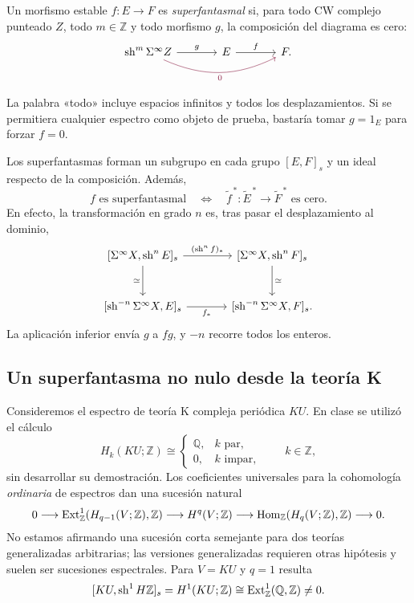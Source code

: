 \begin{defi}\label{defi:c20-superfantasma}
Un morfismo estable $f\colon E\to F$ es \emph{superfantasmal} si, para todo CW complejo punteado $Z$, todo $m\in\mathbb Z$ y todo morfismo $g$, la composición del diagrama es cero:
\[
\begin{tikzcd}[column sep=large]
\sh^m\Sigma^\infty Z\arrow[r,"g"]
\arrow[rr,bend right=25,"0"',color=rojoDiagramaCIMAT]
&E\arrow[r,"f"]&F.
\end{tikzcd}
\]
\end{defi}

La palabra «todo» incluye espacios infinitos y todos los desplazamientos. Si se permitiera cualquier espectro como objeto de prueba, bastaría tomar $g=1_E$ para forzar $f=0$.

Los superfantasmas forman un subgrupo en cada grupo $[E,F]_s$ y un ideal respecto de la composición. Además,
\[
f\text{ es superfantasmal}
\quad\Longleftrightarrow\quad
\widetilde f^{\,*}\colon\widetilde E^{\,*}\longrightarrow\widetilde F^{\,*}
\text{ es cero}.
\]
En efecto, la transformación en grado $n$ es, tras pasar el desplazamiento al dominio,
\[
\begin{tikzcd}[column sep=large,row sep=large]
{[\Sigma^\infty X,\sh^nE]_s}\arrow[r,"(\sh^nf)_*"]\arrow[d,"\simeq"']
&{[\Sigma^\infty X,\sh^nF]_s}\arrow[d,"\simeq"]\\
{[\sh^{-n}\Sigma^\infty X,E]_s}\arrow[r,"f_*"']
&{[\sh^{-n}\Sigma^\infty X,F]_s}.
\end{tikzcd}
\]
La aplicación inferior envía $g$ a $fg$, y $-n$ recorre todos los enteros.

\subsection{Un superfantasma no nulo desde la teoría K}
Consideremos el espectro de teoría K compleja periódica $KU$. En clase se utilizó el cálculo
\[
H_k(KU;\mathbb Z)\cong
\begin{cases}\mathbb Q,&k\text{ par},\\0,&k\text{ impar},\end{cases}
\qquad k\in\mathbb Z,
\]
sin desarrollar su demostración. Los coeficientes universales para la cohomología \emph{ordinaria} de espectros dan una sucesión natural
\[
0\longrightarrow\operatorname{Ext}^1_{\mathbb Z}(H_{q-1}(V;\mathbb Z),\mathbb Z)
\longrightarrow H^q(V;\mathbb Z)
\longrightarrow\operatorname{Hom}_{\mathbb Z}(H_q(V;\mathbb Z),\mathbb Z)
\longrightarrow0.
\]
No estamos afirmando una sucesión corta semejante para dos teorías generalizadas arbitrarias; las versiones generalizadas requieren otras hipótesis y suelen ser sucesiones espectrales. Para $V=KU$ y $q=1$ resulta
\[
[KU,\operatorname{sh}^1H\mathbb Z]_s=H^1(KU;\mathbb Z)
\cong\operatorname{Ext}^1_{\mathbb Z}(\mathbb Q,\mathbb Z)\ne0.
\]

